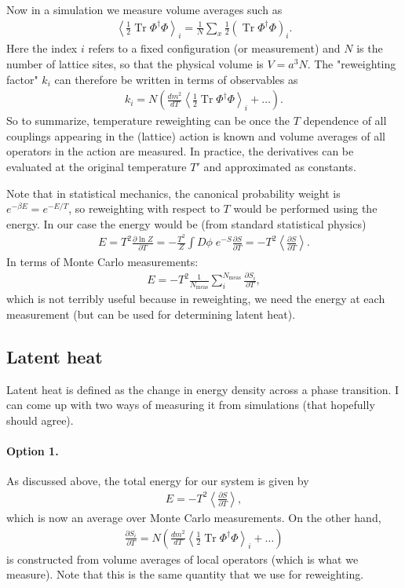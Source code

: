\documentclass[11pt,a4paper]{article}
\newcommand\Tr{\operatorname{Tr}}
\begin{document}
Now in a simulation we measure volume averages such as 
\begin{align}
\left\langle \frac12 \Tr\Phi^\dagger\Phi \right\rangle_i = \frac{1}{N} \sum_x \frac12 (\Tr\Phi^\dagger\Phi)_i.
\end{align}
Here the index $i$ refers to a fixed configuration (or measurement) and $N$ is the number of lattice sites, so that the physical volume is $V=a^3N$. The "reweighting factor" $k_i$ can therefore be written in terms of observables as 
\begin{align}
k_i = N \left( \frac{dm^2}{dT} \left\langle \frac12 \Tr\Phi^\dagger\Phi  \right\rangle_i + \dots \right). 
\end{align}
So to summarize, temperature reweighting can be once the $T$ dependence of all couplings appearing in the (lattice) action is known and volume averages of all operators in the action are measured. In practice, the derivatives can be evaluated at the original temperature $T'$ and approximated as constants. 

Note that in statistical mechanics, the canonical probability weight is $e^{-\beta E} = e^{-E/T}$, so reweighting with respect to $T$ would be performed using the energy. In our case the energy would be (from standard statistical physics) 
\begin{align}
E = T^2 \frac{\partial \ln Z}{\partial T} = -\frac{T^2}{Z} \int D\phi\; e^{-S} \frac{\partial S}{\partial T} = -T^2 \left\langle \frac{\partial S}{\partial T} \right\rangle.
\end{align}
In terms of Monte Carlo measurements:
\begin{align}
E = -T^2 \frac{1}{N_\text{meas}} \sum_i^{N_\text{meas}}\frac{\partial S_i}{\partial T},
\end{align}
which is not terribly useful because in reweighting, we need the energy at each measurement (but can be used for determining latent heat).

\subsection{Latent heat}

Latent heat is defined as the change in energy density across a phase transition. I can come up with two ways of measuring it from simulations (that hopefully should agree). 

\paragraph{Option 1.} As discussed above, the total energy for our system is given by 
\begin{align}
E = -T^2 \left\langle \frac{\partial S}{\partial T} \right\rangle,
\end{align}
which is now an average over Monte Carlo measurements. On the other hand, 
\begin{align}
\frac{\partial S_i}{\partial T} = N \left( \frac{dm^2}{dT} \left\langle \frac12 \Tr\Phi^\dagger\Phi  \right\rangle_i + \dots \right)
\end{align}
is constructed from volume averages of local operators (which is what we measure). Note that this is the same quantity that we use for reweighting. 
\end{document}
